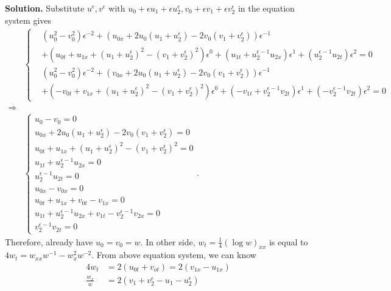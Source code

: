 \documentclass[a4paper]{book}
\newenvironment{solution}%
{\noindent\textbf{Solution.}}%
{\qedhere}
\numberwithin{equation}{chapter}
\theoremstyle{definition}
\begin{document}
\begin{solution}
  Substitute $u^\epsilon, v^\epsilon$ with $ u_0 + \epsilon u_1 + \epsilon u_2^\epsilon, v_0 + \epsilon v_1 + \epsilon v_2^\epsilon$ in the equation system gives
  \begin{align*}
    &\begin{cases}
      & (u_0^2 - v_0^2 )\epsilon^{-2} + (u_{0x} + 2u_0(u_1 + u_2^\epsilon) - 2v_0(v_1 + v_2^\epsilon))\epsilon^{-1}\\ &+ (u_{0t} + u_{1x} + (u_{1} + u_2^\epsilon)^2 - (v_1 + v_2^\epsilon)^2)\epsilon^0 + (u_{1t} + u_{2}^{\epsilon-1}u_{2x}) \epsilon^1 + (u_{2}^{\epsilon-1}u_{2t})\epsilon^2  = 0 \\
      & (u_0^2 - v_0^2 )\epsilon^{-2} + (v_{0x} + 2u_0(u_1 + u_2^\epsilon) - 2v_0(v_1 + v_2^\epsilon))\epsilon^{-1}\\ &+ (- v_{0t} + v_{1x} + (u_{1} + u_2^\epsilon)^2 - (v_1 + v_2^\epsilon)^2)\epsilon^0 + (-v_{1t} + v_{2}^{\epsilon-1}v_{2t}) \epsilon^1 + (-v_{2}^{\epsilon-1}v_{2t})\epsilon^2  = 0 
    \end{cases} \\
    \Longrightarrow \\
    &\begin{cases}
      u_0 - v_0 = 0 \\
      u_{0x} + 2u_0(u_1 + u_2^\epsilon) - 2v_0(v_1 + v_2^\epsilon) = 0 \\
      u_{0t} + u_{1x} + (u_{1} + u_2^\epsilon)^2 - (v_1 + v_2^\epsilon)^2 = 0 \\
      u_{1t} + u_{2}^{\epsilon-1}u_{2x} = 0 \\
      u_{2}^{\epsilon-1}u_{2t} = 0 \\
      u_{0x} - v_{0x} = 0 \\
      u_{0t} + u_{1x} + v_{0t} - v_{1x} = 0 \\
      u_{1t} + u_{2}^{\epsilon-1}u_{2x} + v_{1t} - v_{2}^{\epsilon-1}v_{2x} = 0 \\
      v_{2}^{\epsilon-1}v_{2t} = 0
    \end{cases}.
  \end{align*}
  Therefore, already have $u_0 = v_0 = w$. In other side, $w_t = \frac{1}{4} (\log w)_{xx}$ is equal to $4 w_t = w_{xx} w^{-1} - w_x^2 w^{-2}$. From above equation system, we can know
  \begin{align*}
    4 w_t &= 2(u_{0t} + v_{ot}) = 2(v_{1x} - u_{1x}) \\
    \frac{w_x}{w} &= 2(v_1 + v_2^\epsilon - u_1 - u_2^\epsilon) \\

\end{align*}
\end{solution}
\end{document}

